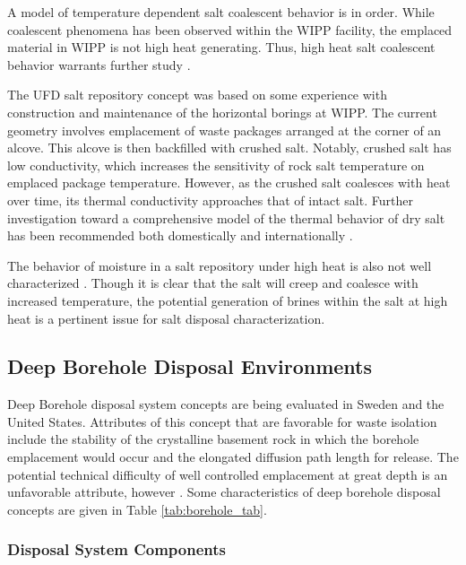 A model of temperature dependent salt coalescent behavior is in order. While 
coalescent phenomena has been observed within the \gls{WIPP} facility, the 
emplaced material in \gls{WIPP} is not high heat generating. Thus, high heat 
salt coalescent behavior warrants further study \cite{carter_disposal_2011}.

The \gls{UFD} salt repository concept was based on some experience with 
construction and maintenance of the horizontal borings at WIPP. The 
current geometry involves emplacement of waste packages arranged at the corner 
of an alcove. This alcove is then backfilled with crushed salt. Notably, crushed salt 
has low conductivity, which increases the sensitivity of rock salt temperature 
on emplaced package temperature. However, as the crushed salt coalesces with 
heat over time, its thermal conductivity approaches that of intact salt. Further 
investigation toward a comprehensive model of the thermal behavior of dry salt 
has been recommended both domestically and internationally 
\cite{carter_disposal_2011}. 

The behavior of moisture in a salt repository under high heat is also not well 
characterized . Though it is clear that the salt will creep and coalesce with 
increased temperature, the potential generation of brines within the salt at 
high heat is a pertinent issue for salt disposal characterization. 



\subsection{Deep Borehole Disposal Environments}

Deep Borehole disposal system concepts are being evaluated in Sweden and the 
United States. Attributes of this concept that are favorable for waste 
isolation include the stability of the crystalline basement rock in which the 
borehole emplacement would occur and the elongated diffusion path length for 
release. The potential technical difficulty of well controlled emplacement 
at great depth is an unfavorable attribute, however \cite{hardin_generic_2011}.
Some characteristics of deep borehole disposal 
concepts are given in Table \ref{tab:borehole_tab}.   



\subsubsection{Disposal System Components}

